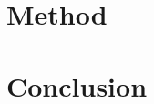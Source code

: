 \documentclass{scrartcl}
\begin{document}
\section{Method}

\section{Conclusion} 




\begin{appendix}
\section{}

\end{appendix}






%


\end{document}
